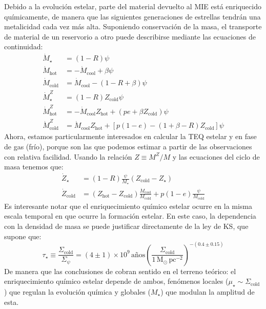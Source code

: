 \documentclass{article}
\begin{document}
\begin{description}
Debido a la evolución estelar, parte del material devuelto al MIE está enriquecido químicamente, de
manera que las siguientes generaciones de estrellas tendrán una metalicidad cada vez más alta.
Suponiendo conservación de la masa, el transporte de material de un reservorio a otro puede
describirse mediante las ecuaciones de continuidad:
%
\begin{subequations}
\begin{align}
\dot{M}_\star         &= (1-R)\psi \\
\dot{M}_\text{hot}    &= -\dot{M}_\text{cool} + \beta\psi \\
\dot{M}_\text{cold}   &= \dot{M}_\text{cool} - (1-R+\beta)\psi \\
\dot{M}_\star^Z       &= (1-R)Z_\text{cold}\psi \\
\dot{M}_\text{hot}^Z  &= -\dot{M}_\text{cool}Z_\text{hot} + (pe+\beta Z_\text{cold})\psi \\
\dot{M}_\text{cold}^Z &= \dot{M}_\text{cool}Z_\text{hot} + [p(1-e)-(1+\beta-R)Z_\text{cold}]\psi
\end{align}
\end{subequations}
%
Ahora, estamos particularmente interesados en calcular la TEQ estelar y en fase de gas (frío),
porque son las que podemos estimar a partir de las observaciones con relativa facilidad. Usando la
relación $Z\equiv M^Z/M$ y las ecuaciones del ciclo de masa tenemos que:
%
\begin{subequations}
\begin{align}
\dot{Z}_\star       &= (1-R)\frac{\psi}{M_\star}(Z_\text{cold}-Z_\star) \\
\dot{Z}_\text{cold} &= (Z_\text{hot}-Z_\text{cold})\frac{\dot{M}_\text{cool}}{M_\text{cold}} + p(1-e)\frac{\psi}{M_\text{cold}}
\end{align}
\end{subequations}
%
Es interesante notar que el enriquecimiento químico estelar ocurre en la misma escala temporal en
que ocurre la formación estelar. En este caso, la dependencia con la densidad de masa se puede
justificar directamente de la ley de KS, que supone que:
%
\begin{equation}
\tau_\star \equiv \frac{\Sigma_\text{cold}}{\Sigma_\psi} = (4\pm1)\times10^9\,\text{años}\left(\frac{\Sigma_\text{cold}}{1\,\text{M}_\odot\,\text{pc}^{-2}}\right)^{-(0.4\pm0.15)}
\end{equation}
%
De manera que las conclusiones de \citet{Gonzalez2014b} cobran sentido en el terreno teórico: el
enriquecimiento químico estelar depende de ambos, fenómenos locales
($\mu_\star\sim\Sigma_\text{cold}$) que regulan la evolución química y globales ($M_\star$) que
modulan la amplitud de esta.


\end{description}
\end{document}

